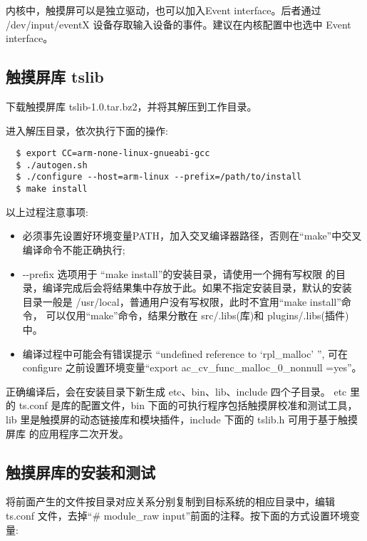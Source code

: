 内核中，触摸屏可以是独立驱动，也可以加入Event interface。后者通过
/dev/input/eventX 设备存取输入设备的事件。建议在内核配置中也选中
Event interface。

\subsection{触摸屏库 tslib}
下载触摸屏库 tslib-1.0.tar.bz2，并将其解压到工作目录。

进入解压目录，依次执行下面的操作:
\begin{verbatim}
  $ export CC=arm-none-linux-gnueabi-gcc
  $ ./autogen.sh
  $ ./configure --host=arm-linux --prefix=/path/to/install
  $ make install
\end{verbatim}

以上过程注意事项:
\begin{itemize}
  \item 必须事先设置好环境变量PATH，加入交叉编译器路径，否则在``make''中交叉
	编译命令不能正确执行;
  \item -{}-prefix 选项用于 ``make install''的安装目录，请使用一个拥有写权限
	的目录，编译完成后会将结果集中存放于此。如果不指定安装目录，默认的安装
	目录一般是 /usr/local，普通用户没有写权限，此时不宜用``make install''命令，
	可以仅用``make''命令，结果分散在 src/.libs(库)和 plugins/.libs(插件)中。
  \item 编译过程中可能会有错误提示 ``undefined reference to `rpl\_malloc' '',
	可在 configure 之前设置环境变量``export ac\_cv\_func\_malloc\_0\_nonnull
	=yes''。
\end{itemize}

正确编译后，会在安装目录下新生成 etc、bin、lib、include 四个子目录。
etc 里的 ts.conf 是库的配置文件，bin 下面的可执行程序包括触摸屏校准和测试工具，
lib 里是触摸屏的动态链接库和模块插件，include 下面的 tslib.h 可用于基于触摸屏库
的应用程序二次开发。

\subsection{触摸屏库的安装和测试}
将前面产生的文件按目录对应关系分别复制到目标系统的相应目录中，编辑 ts.conf
文件，去掉``\# module\_raw input''前面的注释。按下面的方式设置环境变量:

